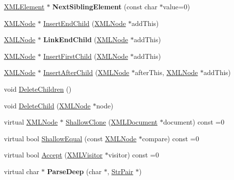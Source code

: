 \begin{DoxyCompactItemize}
\mbox{\label{classtinyxml2_1_1XMLNode_acf735bf653016792522305d8ad4b3029}} 
\hyperlink{classtinyxml2_1_1XMLElement}{X\+M\+L\+Element} $\ast$ {\bfseries Next\+Sibling\+Element} (const char $\ast$value=0)
\item 
\hyperlink{classtinyxml2_1_1XMLNode}{X\+M\+L\+Node} $\ast$ \hyperlink{classtinyxml2_1_1XMLNode_aeb249ed60f4e8bfad3709151c3ee4286}{Insert\+End\+Child} (\hyperlink{classtinyxml2_1_1XMLNode}{X\+M\+L\+Node} $\ast$add\+This)
\item 
\mbox{\label{classtinyxml2_1_1XMLNode_a663e3a5a378169fd477378f4d17a7649}} 
\hyperlink{classtinyxml2_1_1XMLNode}{X\+M\+L\+Node} $\ast$ {\bfseries Link\+End\+Child} (\hyperlink{classtinyxml2_1_1XMLNode}{X\+M\+L\+Node} $\ast$add\+This)
\item 
\hyperlink{classtinyxml2_1_1XMLNode}{X\+M\+L\+Node} $\ast$ \hyperlink{classtinyxml2_1_1XMLNode_a8ff7dc071f3a1a6ae2ac25a37492865d}{Insert\+First\+Child} (\hyperlink{classtinyxml2_1_1XMLNode}{X\+M\+L\+Node} $\ast$add\+This)
\item 
\hyperlink{classtinyxml2_1_1XMLNode}{X\+M\+L\+Node} $\ast$ \hyperlink{classtinyxml2_1_1XMLNode_a85adb8f0b7477eec30f9a41d420b09c2}{Insert\+After\+Child} (\hyperlink{classtinyxml2_1_1XMLNode}{X\+M\+L\+Node} $\ast$after\+This, \hyperlink{classtinyxml2_1_1XMLNode}{X\+M\+L\+Node} $\ast$add\+This)
\item 
void \hyperlink{classtinyxml2_1_1XMLNode_a0360085cc54df5bff85d5c5da13afdce}{Delete\+Children} ()
\item 
void \hyperlink{classtinyxml2_1_1XMLNode_a363b6edbd6ebd55f8387d2b89f2b0921}{Delete\+Child} (\hyperlink{classtinyxml2_1_1XMLNode}{X\+M\+L\+Node} $\ast$node)
\item 
virtual \hyperlink{classtinyxml2_1_1XMLNode}{X\+M\+L\+Node} $\ast$ \hyperlink{classtinyxml2_1_1XMLNode_a8402cbd3129d20e9e6024bbcc0531283}{Shallow\+Clone} (\hyperlink{classtinyxml2_1_1XMLDocument}{X\+M\+L\+Document} $\ast$document) const =0
\item 
virtual bool \hyperlink{classtinyxml2_1_1XMLNode_a7ce18b751c3ea09eac292dca264f9226}{Shallow\+Equal} (const \hyperlink{classtinyxml2_1_1XMLNode}{X\+M\+L\+Node} $\ast$compare) const =0
\item 
virtual bool \hyperlink{classtinyxml2_1_1XMLNode_a81e66df0a44c67a7af17f3b77a152785}{Accept} (\hyperlink{classtinyxml2_1_1XMLVisitor}{X\+M\+L\+Visitor} $\ast$visitor) const =0
\item 
\mbox{\label{classtinyxml2_1_1XMLNode_a8263ad55d894578e8e72a65c56649138}} 
virtual char $\ast$ {\bfseries Parse\+Deep} (char $\ast$, \hyperlink{classtinyxml2_1_1StrPair}{Str\+Pair} $\ast$)
\end{DoxyCompactItemize}
